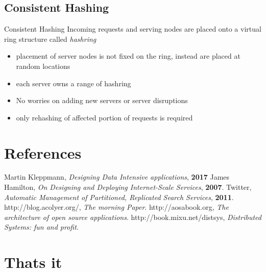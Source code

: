 \documentclass[9pt]{beamer}
\begin{document}

\subsection{Consistent Hashing}
\begin{frame}{Consistent Hashing}
  Incoming requests and serving nodes are placed onto a virtual ring structure called \textit{hashring}

    
  \begin{itemize}
    \item placement of server nodes is not fixed on the ring, instead are placed at random locations
    \item each server owns a range of hashring
    \item No worries on adding new servers or server disruptions
    \item only rehashing of affected portion of requests is required
  \end{itemize}
\end{frame}

\section{References}
\begin{frame}
  
  \begin{thebibliography}{99}
   Martin Kleppmann, \newblock \emph{Designing Data Intensive applications}, \textbf{2017}
   James Hamilton,  \newblock \emph{On Designing and Deploying Internet-Scale Services}, \textbf{2007}.
   Twitter,  \newblock \emph{Automatic Management of Partitioned, Replicated Search Services}, \textbf{2011}.
   http://blog.acolyer.org/, \newblock \emph{The morning Paper}.
   http://aosabook.org, \newblock \emph{The architecture of open source applications}.
   http://book.mixu.net/distsys, \newblock \emph{Distributed Systems: fun and profit}.
  \end{thebibliography}
\end{frame}

\section{Thats it}
\begin{frame}{}
\end{frame}
\end{document}

